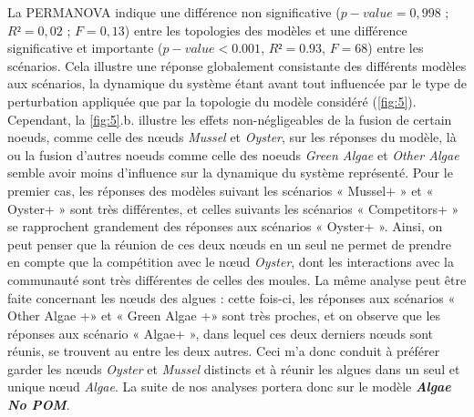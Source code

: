 \documentclass[12pt]{report}
\begin{document}
La PERMANOVA indique une différence non significative ($p-value = 0,998$ ; $R² = 0,02$ ; $F = 0,13$) entre les topologies des modèles et une différence significative et importante ($p-value < 0.001$, $R² = 0.93$, $F = 68$) entre les scénarios. Cela illustre une réponse globalement consistante des différents modèles aux scénarios, la dynamique du système étant avant tout influencée par le type de perturbation appliquée que par la topologie du modèle considéré (\autoref{fig:5}). Cependant, la \autoref{fig:5}.b. illustre les effets non-négligeables de la fusion de certain noeuds, comme celle des nœuds \textit{Mussel} et \textit{Oyster}, sur les réponses du modèle, là ou la fusion d’autres noeuds comme celle des noeuds \textit{Green Algae} et  \textit{Other Algae} semble avoir moins d’influence sur la dynamique du système représenté. Pour le premier cas, les réponses des modèles suivant les scénarios « Mussel+ » et « Oyster+ » sont très différentes, et celles suivants les scénarios « Competitors+ » se rapprochent grandement des réponses aux scénarios « Oyster+ ». Ainsi, on peut penser que la réunion de ces deux nœuds en un seul ne permet de prendre en compte que la compétition avec le nœud \textit{Oyster}, dont les interactions avec la communauté sont très différentes de celles des moules. La même analyse peut être faite concernant les nœuds des algues : cette fois-ci, les réponses aux scénarios « Other Algae +» et « Green Algae +» sont très proches, et on observe que les réponses aux scénario « Algae+ », dans lequel ces deux derniers nœuds sont réunis, se trouvent au entre les deux autres. Ceci m'a donc conduit à préférer garder les nœuds \textit{Oyster} et \textit{Mussel} distincts et à réunir les algues dans un seul et unique nœud \textit{Algae}. La suite de nos analyses portera donc sur le modèle \textbf{\textit{Algae No POM}}.
\end{document}
